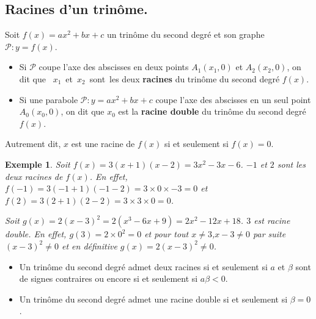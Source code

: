 \documentclass[a4paper,11pt]{article}
\theoremstyle{break}
\newtheorem{exemple}{Exemple}
\begin{document}
  
  \subsection{Racines d'un trinôme.}
  
  \begin{Def}
    Soit $f(x)=ax^2+bx+c$ un trinôme du second degré et son graphe $\mathcal{P}:y=f(x)$.
    \begin{itemize}
     \item 
    Si $\mathcal{P}$ coupe l'axe des abscisses en deux points 
    $A_1(x_1,0)$ et $A_2(x_2,0)$,
    on dit que \mbox{ $x_1$ et $x_2$ sont les} deux \textbf{racines} 
    du trinôme du second degré $f(x)$.
    
    \item
    Si une parabole $\mathcal{P}:y=ax^2+bx+c$ coupe l'axe des abscisses en un seul 
    point $A_0(x_0,0)$, on dit que $x_0$ est la \textbf{racine double} du trinôme du second 
    degré $f(x)$.
    
    
    \end{itemize}

    
    Autrement dit, $x$ est une racine de $f(x)$ si et seulement si $f(x)=0$.
  \end{Def}
  
  \begin{exemple}
    Soit $f(x)=3(x+1)(x-2)=3x^2-3x-6$. $-1$ et $2$ sont les deux racines de $f(x)$.\newline
    En effet, $f(-1)=3(-1+1)(-1-2)=3\times0 \times -3=0$ et $f(2)=3(2+1)(2-2)=3 \times 3 \times 0=0$.
    
    Soit $g(x)=2(x-3)^2=2(x^3-6x+9)=2x^2-12x+18$. $3$ est racine double. 
    En effet, $g(3)=2\times 0^2=0$ et pour tout $x \neq 3$,$x-3\neq0$ par suite 
    $(x-3)^2 \neq 0$ et en définitive $g(x)=2(x-3)^2 \neq 0$. 
  \end{exemple}
  
  \begin{Prop}
    \begin{itemize}
     \item Un trinôme du second degré admet deux racines si et seulement si $a$ et $\beta$
   sont de signes contraires ou encore si et seulement si $a\beta<0$.
     \item Un trinôme du second degré admet une racine double si et seulement si
     $\beta=0$.
    \end{itemize}
  \end{Prop}
  
\end{document}
